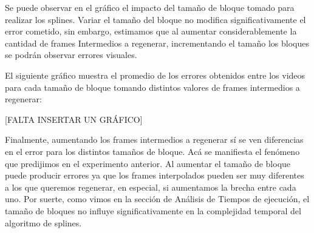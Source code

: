 \begin{figure}[ht]
	\begin{center}
	\end{center}
\end{figure}

\par Se puede observar en el gráfico el impacto del tamaño de bloque tomado para realizar los splines. Variar el tamaño del bloque no modifica significativamente el error cometido, sin embargo, estimamos que al aumentar considerablemente la cantidad  de frames Intermedios a regenerar, incrementando el tamaño los bloques se podrán observar errores visuales. 
\par El siguiente gráfico muestra el promedio de los errores obtenidos entre los videos para cada tamaño de bloque tomando distintos valores de frames intermedios a regenerar:

\bigskip

[FALTA INSERTAR UN GRÁFICO]

\bigskip

\par Finalmente, aumentando los frames intermedios a regenerar sí se ven diferencias en el error para los distintos tamaños de bloque. Acá se manifiesta el fenómeno que predijimos en el experimento anterior. Al aumentar el tamaño de bloque puede producir errores ya que los frames interpolados pueden ser muy diferentes a los que queremos regenerar, en especial, si aumentamos la brecha entre cada uno. Por suerte, como vimos en la sección de Análisis de Tiempos de ejecución, el tamaño de bloques no influye significativamente en la complejidad temporal del algoritmo de splines.

